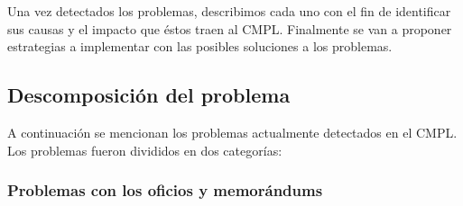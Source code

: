 Una vez detectados los problemas, describimos cada uno con el fin de identificar sus causas y el impacto que éstos traen al CMPL. Finalmente se van a proponer estrategias a implementar con las posibles soluciones a los problemas. 
	\subsection{Descomposición del problema}
	A continuación se mencionan los problemas actualmente detectados en el CMPL. Los problemas fueron divididos en dos categorías:
	
		\subsubsection{Problemas con los oficios y memorándums}

